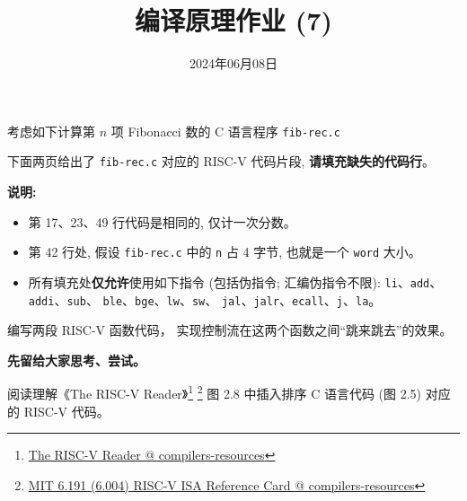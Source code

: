 \documentclass[a4paper, justified]{tufte-handout}
\title{编译原理作业 (7)}
\date{2024年06月08日}
\begin{document}
\maketitle
\noplagiarism %
\begin{abstract}
\end{abstract}
\beginrequired

\begin{problem}
	考虑如下计算第 $n$ 项 Fibonacci 数的 C 语言程序 \texttt{fib-rec.c}

	下面两页给出了 \texttt{fib-rec.c} 对应的 RISC-V 代码片段,
	{\bf 请填充缺失的代码行}。

	{\bf 说明:}
	\begin{itemize}
		\item 第 17、23、49 行代码是相同的, 仅计一次分数。
		\item 第 42 行处, 假设 \texttt{fib-rec.c} 中的 \texttt{n} 占 4 字节,
		  也就是一个 \texttt{word} 大小。
		\item 所有填充处{\bf 仅允许}使用如下指令 (包括伪指令; 汇编伪指令不限):
			\texttt{li}、\texttt{add}、\texttt{addi}、\texttt{sub}、
		  \texttt{ble}、\texttt{bge}、\texttt{lw}、\texttt{sw}、
			\texttt{jal}、\texttt{jalr}、\texttt{ecall}、\texttt{j}、\texttt{la}。
	\end{itemize}

\end{problem}

\begin{solution}
\end{solution}


\begin{problem}
	编写两段 RISC-V 函数代码，
	实现控制流在这两个函数之间``跳来跳去''的效果。
\end{problem}

\begin{solution}
	{\bf 先留给大家思考、尝试。}
\end{solution}

\begin{problem}
	阅读理解《The RISC-V Reader》\footnote{\href{https://github.com/courses-at-nju-by-hfwei/compilers-resources/blob/master/material/riscv/The\%20RISC-V\%20Reader\%20An\%20Open\%20Architecture\%20Atlas\%20(Chinese\%20Translation).pdf}
	{The RISC-V Reader @ compilers-resources}}
	\footnote{\href{https://github.com/courses-at-nju-by-hfwei/compilers-resources/blob/master/material/riscv/MIT\%206.191\%20(6.004)\%20RISC-V\%20ISA\%20Reference\%20Card.pdf}{MIT 6.191 (6.004) RISC-V ISA Reference Card @ compilers-resources}}
	图 2.8 中插入排序 C 语言代码 (图 2.5)
	对应的 RISC-V 代码。
\end{problem}
\end{document}
